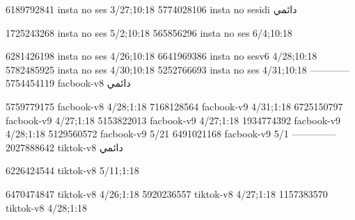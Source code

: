 
6189792841 insta no ses
3/27;10:18
5774028106 insta no sesidi
دائمي


1725243268 insta no ses
5/2;10:18
565856296 insta no ses
6/4;10:18

6281426198 insta no ses
4/26;10:18
6641969386 insta no sesv6
4/28;10:18
5782485925 insta no ses
4/30;10:18
5252766693 insta no ses
4/31;10:18
------------
5754454119 facbook-v8
دائمي

5759779175 facbook-v8
4/28;1:18
7168128564 facbook-v9
4/31;1:18
6725150797 facbook-v9
4/27;1:18
5153822013 facbook-v9
4/27;1:18
1934774392 facbook-v9
4/28;1:18
5129560572 facbook-v9
5/21
6491021168 facbook-v9
5/1
--------------
2027888642 tiktok-v8
دائمي

6226424544 tiktok-v8
5/11;1:18

6470474847 tiktok-v8
4/26;1:18
5920236557 tiktok-v8
4/27;1:18
1157383570 tiktok-v8
4/28;1:18
